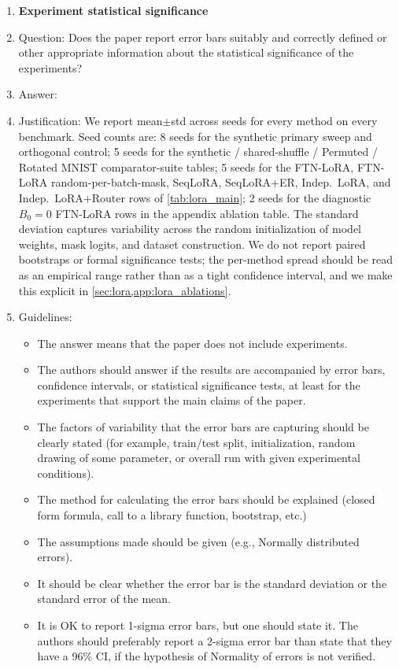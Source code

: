 \begin{enumerate}
\item {\bf Experiment statistical significance}
    \item[] Question: Does the paper report error bars suitably and correctly defined or other appropriate information about the statistical significance of the experiments?
    \item[] Answer: \answerYes{}
    \item[] Justification: We report mean$\pm$std across seeds for every method on every benchmark. Seed counts are: 8 seeds for the synthetic primary sweep and orthogonal control; 5 seeds for the synthetic / shared-shuffle / Permuted / Rotated MNIST comparator-suite tables; 5 seeds for the FTN-LoRA, FTN-LoRA random-per-batch-mask, SeqLoRA, SeqLoRA+ER, Indep.\ LoRA, and Indep.\ LoRA+Router rows of \cref{tab:lora_main}; 2 seeds for the diagnostic $B_0{=}0$ FTN-LoRA rows in the appendix ablation table. The standard deviation captures variability across the random initialization of model weights, mask logits, and dataset construction. We do not report paired bootstraps or formal significance tests; the per-method spread should be read as an empirical range rather than as a tight confidence interval, and we make this explicit in \cref{sec:lora,app:lora_ablations}.
    \item[] Guidelines:
    \begin{itemize}
        \item The answer \answerNA{} means that the paper does not include experiments.
        \item The authors should answer \answerYes{} if the results are accompanied by error bars, confidence intervals, or statistical significance tests, at least for the experiments that support the main claims of the paper.
        \item The factors of variability that the error bars are capturing should be clearly stated (for example, train/test split, initialization, random drawing of some parameter, or overall run with given experimental conditions).
        \item The method for calculating the error bars should be explained (closed form formula, call to a library function, bootstrap, etc.)
        \item The assumptions made should be given (e.g., Normally distributed errors).
        \item It should be clear whether the error bar is the standard deviation or the standard error of the mean.
        \item It is OK to report 1-sigma error bars, but one should state it. The authors should preferably report a 2-sigma error bar than state that they have a 96\% CI, if the hypothesis of Normality of errors is not verified.

\end{itemize}
\end{enumerate}
